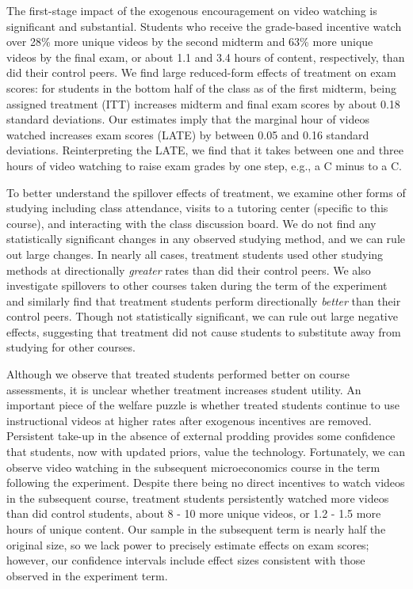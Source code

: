 \documentclass[12pt]{article}
\begin{document}
The first-stage impact of the exogenous encouragement on video watching is significant and substantial.
Students who receive the grade-based incentive watch over 28\% more unique videos by the second midterm and 63\% more unique videos by the final exam, or about 1.1 and 3.4 hours of content, respectively, than did their control peers.
We find large reduced-form effects of treatment on exam scores: for students in the bottom half of the class as of the first midterm, being assigned treatment (ITT) increases midterm and final exam scores by about 0.18 standard deviations.
Our estimates imply that the marginal hour of videos watched increases exam scores (LATE) by between 0.05 and 0.16 standard deviations.
Reinterpreting the LATE, we find that it takes between one and three hours of video watching to raise exam grades by one step, e.g., a C minus to a C\@.

To better understand the spillover effects of treatment, we examine other forms of studying including class attendance, visits to a tutoring center (specific to this course), and interacting with the class discussion board.
We do not find any statistically significant changes in any observed studying method, and we can rule out large changes.
In nearly all cases, treatment students used other studying methods at directionally \textit{greater} rates than did their control peers.
We also investigate spillovers to other courses taken during the term of the experiment and similarly find that treatment students perform directionally \textit{better} than their control peers.
Though not statistically significant, we can rule out large negative effects, suggesting that treatment did not cause students to substitute away from studying for other courses.

Although we observe that treated students performed better on course assessments, it is unclear whether treatment increases student utility.
An important piece of the welfare puzzle is whether treated students continue to use instructional videos at higher rates after exogenous incentives are removed.
Persistent take-up in the absence of external prodding provides some confidence that students, now with updated priors, value the technology.
Fortunately, we can observe video watching in the subsequent microeconomics course in the term following the experiment.
Despite there being no direct incentives to watch videos in the subsequent course, treatment students persistently watched more videos than did control students, about 8 - 10 more unique videos, or 1.2 - 1.5 more hours of unique content.
Our sample in the subsequent term is nearly half the original size, so we lack power to precisely estimate effects on exam scores;
however, our confidence intervals include effect sizes consistent with those observed in the experiment term.
\end{document}
